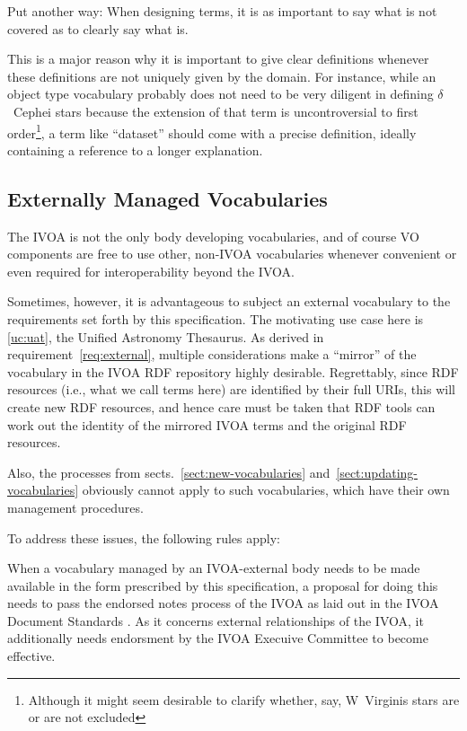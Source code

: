 \documentclass[11pt,a4paper]{ivoa}
\begin{document}
Put another way: When designing terms, it is as important to say what is
not covered as to clearly say what is.

This is a major reason why it is important to give clear definitions
whenever these definitions are not uniquely given by the domain.  For
instance, while an object type vocabulary probably does not need to be
very diligent in defining $\delta$~Cephei stars because the extension of
that term is uncontroversial to first order\footnote{Although it might
seem desirable to clarify whether, say, W~Virginis stars are or are not
excluded}, a term like ``dataset'' should come with a precise
definition, ideally containing a reference to a longer explanation.

\subsection{Externally Managed Vocabularies}
\label{sect:externally-managed}

The IVOA is not the only body developing vocabularies, and of course VO
components are free to use other, non-IVOA vocabularies whenever
convenient or even required for interoperability beyond the IVOA.

Sometimes, however, it is advantageous to subject an external vocabulary
to the requirements set forth by this specification.  The motivating use
case here is \ref{uc:uat}, the Unified Astronomy Thesaurus.  As derived
in requirement~\ref{req:external}, multiple considerations make a
``mirror'' of the vocabulary in the IVOA RDF repository highly
desirable.  Regrettably, since RDF resources (i.e., what we call terms
here) are identified by their full URIs, this will create new RDF
resources, and hence care must be taken that RDF tools can work out the
identity of the mirrored IVOA terms and the original RDF resources.

Also, the processes from sects.~\ref{sect:new-vocabularies}
and~\ref{sect:updating-vocabularies} obviously cannot apply to such
vocabularies, which have their own management procedures.

To address these issues, the following rules apply:

When a vocabulary managed by an IVOA-external body needs to be made
available in the form prescribed by this specification, a proposal for
doing this needs to pass the endorsed notes process of the IVOA as laid
out in the IVOA Document Standards \citep{2017ivoa.spec.0517G}.  As it
concerns external relationships of the IVOA, it additionally needs
endorsment by the IVOA Execuive Committee to become effective.
\end{document}
